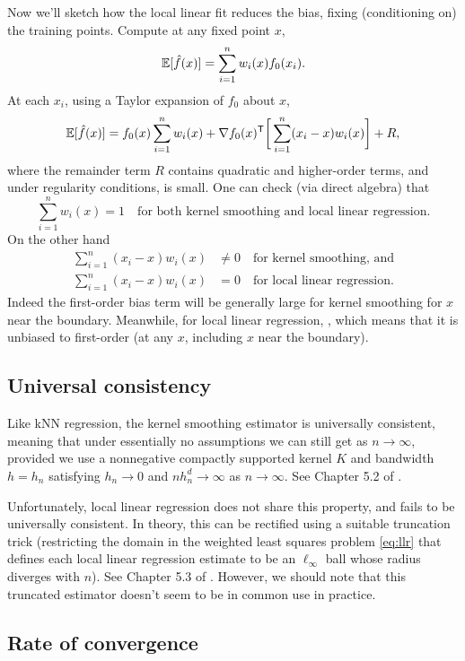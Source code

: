 \documentclass{article}
\begin{document}
Now we'll sketch how the local linear fit reduces the bias, fixing (conditioning
on) the training points. Compute at any fixed point $x$,  
\[
\mathbb{E}[\hat{f}(x)] = \sum_{i=1}^n w_i(x) f_0(x_i).
\]
At each $x_i$, using a Taylor expansion of $f_0$ about $x$,
\[
\mathbb{E}[\hat{f}(x)] = f_0(x) \sum_{i=1}^n w_i(x) + \nabla f_0(x)^{\mathsf{T}} \bigg[
\sum_{i=1}^n (x_i-x) w_i(x) \bigg] + R, 
\]
where the remainder term $R$ contains quadratic and higher-order terms, and
under regularity conditions, is small. One can check (via direct algebra) that
\[
\sum_{i=1}^n w_i(x) = 1 \quad \text{for both kernel smoothing and local linear
  regression}. 
\]
On the other hand 
\begin{align*}
\sum_{i=1}^n (x_i-x) w_i(x) &\not= 0 
\quad \text{for kernel smoothing, and} \\
\sum_{i=1}^n (x_i-x) w_i(x) &= 0 
\quad \text{for local linear regression}. 
\end{align*}
Indeed the first-order bias term  will be generally large for kernel smoothing for $x$ near the
boundary. Meanwhile, for local linear regression, , which means that it is unbiased to first-order (at any $x$, including $x$
near the boundary).    

\subsection{Universal consistency}

Like kNN regression, the kernel smoothing estimator is universally consistent,
meaning that under essentially no assumptions we can still get
 as $n \to \infty$, provided we use a
nonnegative compactly supported kernel $K$ and bandwidth $h=h_n$ satisfying 
$h_n \to 0$ and $nh_n^d \to \infty$ as $n \to \infty$. See Chapter 5.2 of
\citet{gyorfi2002distribution}. 

Unfortunately, local linear regression does not share this property, and fails
to be universally consistent. In theory, this can be rectified using a suitable
truncation trick (restricting the domain in the weighted least squares problem
\eqref{eq:llr} that defines each local linear regression estimate to be an
$\ell_\infty$ ball whose radius diverges with $n$). See Chapter 5.3 of 
\citet{gyorfi2002distribution}. However, we should note that this truncated
estimator doesn't seem to be in common use in practice.  

\subsection{Rate of convergence}
\end{document}
